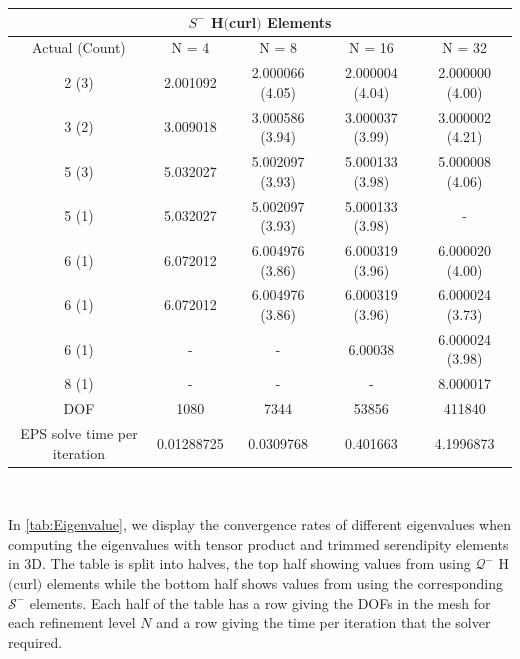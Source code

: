 \documentclass[format=acmsmall,screen,timestamp=false,a4paper]{acmart}
\begin{document}
\begin{table}[htbp]
\begin{tabular}{ c c c c c }
\multicolumn{5}{c}{$S^-$ H$($curl$)$ Elements} \\
\hline
Actual (Count) & N = 4 & N = 8 & N = 16 & N = 32 \\ 
\hline
2 (3) & 2.001092 & 2.000066 (4.05) & 2.000004 (4.04) & 2.000000 (4.00) \\  
3 (2) & 3.009018 & 3.000586 (3.94) & 3.000037 (3.99) & 3.000002 (4.21) \\
5 (3) & 5.032027 & 5.002097 (3.93)& 5.000133 (3.98) & 5.000008 (4.06) \\
5 (1) & 5.032027 & 5.002097 (3.93) & 5.000133 (3.98) & - \\
6 (1) & 6.072012 & 6.004976 (3.86) & 6.000319 (3.96) & 6.000020 (4.00) \\
6 (1) & 6.072012 & 6.004976 (3.86) & 6.000319 (3.96) & 6.000024 (3.73)\\
6 (1) & - & - & 6.00038 & 6.000024 (3.98)\\
8 (1) & - & - & - & 8.000017 \\
\hline
DOF  & 1080 & 7344 & 53856 & 411840 \\
\hline
EPS solve time per iteration & 0.01288725 & 0.0309768 & 0.401663 & 4.1996873 \\
\hline
\end{tabular}\\[0.5em]


\end{table}

In \cref{tab:Eigenvalue}, we display the convergence rates of different eigenvalues when computing the eigenvalues with tensor product and trimmed serendipity elements in 3D.  The table is split into halves, the top half showing values from using $\mathcal{Q}^-$ H$($curl$)$ elements while the bottom half shows values from using the corresponding $\mathcal{S}^-$ elements.  Each half of the table has a row giving the DOFs in the mesh for each refinement level $N$ and a row giving the time per iteration that the solver required.  
\end{document}

